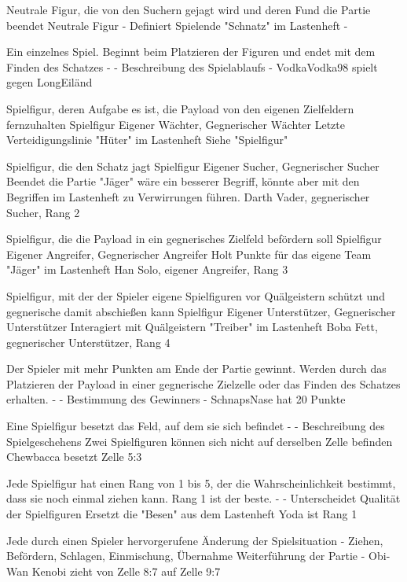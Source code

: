 {Neutrale Figur, die von den Suchern gejagt wird und deren Fund die Partie beendet}
{Neutrale Figur}
{-}
{Definiert Spielende}
{"Schnatz" im Lastenheft}
{-}

{Ein einzelnes Spiel. Beginnt beim Platzieren der Figuren und endet mit dem Finden des Schatzes}
{-}
{-}
{Beschreibung des Spielablaufs}
{-}
{VodkaVodka98 spielt gegen LongEiländ}

{Spielfigur, deren Aufgabe es ist, die Payload von den eigenen Zielfeldern fernzuhalten}
{Spielfigur}
{Eigener Wächter, Gegnerischer Wächter}
{Letzte Verteidigungslinie}
{"Hüter" im Lastenheft}
{Siehe "Spielfigur"}

{Spielfigur, die den Schatz jagt}
{Spielfigur}
{Eigener Sucher, Gegnerischer Sucher}
{Beendet die Partie}
{"Jäger" wäre ein besserer Begriff, könnte aber mit den Begriffen im Lastenheft zu Verwirrungen führen.}
{Darth Vader, gegnerischer Sucher, Rang 2}

{Spielfigur, die die Payload in ein gegnerisches Zielfeld befördern soll}
{Spielfigur}
{Eigener Angreifer, Gegnerischer Angreifer}
{Holt Punkte für das eigene Team}
{"Jäger" im Lastenheft}
{Han Solo, eigener Angreifer, Rang 3}

{Spielfigur, mit der der Spieler eigene Spielfiguren vor Quälgeistern schützt und gegnerische damit abschießen kann}
{Spielfigur}
{Eigener Unterstützer, Gegnerischer Unterstützer}
{Interagiert mit Quälgeistern}
{"Treiber" im Lastenheft}
{Boba Fett, gegnerischer Unterstützer, Rang 4}

{Der Spieler mit mehr Punkten am Ende der Partie gewinnt. Werden durch das Platzieren der Payload in einer gegnerische Zielzelle oder das Finden des Schatzes erhalten.}
{-}
{-}
{Bestimmung des Gewinners}
{-}
{SchnapsNase hat 20 Punkte}

{Eine Spielfigur besetzt das Feld, auf dem sie sich befindet}
{-}
{-}
{Beschreibung des Spielgeschehens}
{Zwei Spielfiguren können sich nicht auf derselben Zelle befinden}
{Chewbacca besetzt Zelle 5:3}

{Jede Spielfigur hat einen Rang von 1 bis 5, der die Wahrscheinlichkeit bestimmt, dass sie noch einmal ziehen kann. Rang 1 ist der beste.}
{-}
{-}
{Unterscheidet Qualität der Spielfiguren}
{Ersetzt die "Besen" aus dem Lastenheft}
{Yoda ist Rang 1}

{Jede durch einen Spieler hervorgerufene Änderung der Spielsituation}
{-}
{Ziehen, Befördern, Schlagen, Einmischung, Übernahme}
{Weiterführung der Partie}
{-}
{Obi-Wan Kenobi zieht von Zelle 8:7 auf Zelle 9:7}

